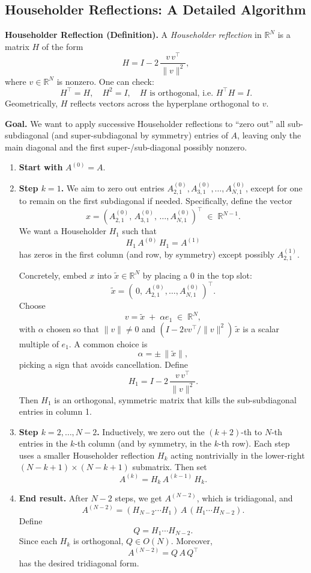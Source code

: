 \documentclass[letterpaper,11pt,oneside,reqno]{article}
\numberwithin{equation}{section}
\theoremstyle{definition}
\begin{document}
\subsection{Householder Reflections: A Detailed Algorithm}

\noindent
\textbf{Householder Reflection (Definition).}
A \emph{Householder reflection} in \(\mathbb{R}^N\) is a matrix \(H\) of the form
\[
  H = I - 2\,\frac{v\,v^\top}{\|v\|^2},
\]
where \(v\in\mathbb{R}^N\) is nonzero. One can check:
\[
  H^\top = H,\quad
  H^2 = I,\quad
  H\text{ is orthogonal, i.e.\ }H^\top H = I.
\]
Geometrically, \(H\) reflects vectors across the hyperplane orthogonal to \(v\).

\medskip
\noindent
\textbf{Goal.}
We want to apply successive Householder reflections to “zero out” all sub-subdiagonal (and super-subdiagonal by symmetry) entries of \(A\), leaving only the main diagonal and the first super-/sub-diagonal possibly nonzero.

\begin{enumerate}[1.]
\item \textbf{Start with } \(A^{(0)}=A\).
\item \textbf{Step \(k=1\).}
   We aim to zero out entries \(A^{(0)}_{2,1},A^{(0)}_{3,1},\ldots,A^{(0)}_{N,1}\), except for one to remain on the first subdiagonal if needed. Specifically, define the vector
   \[
     x
     = (A^{(0)}_{2,1},\,A^{(0)}_{3,1},\,\dots,A^{(0)}_{N,1})^\top
     \;\in\;\mathbb{R}^{N-1}.
   \]
   We want a Householder \(H_1\) such that
   \[
     H_1\,A^{(0)}\,H_1
     = A^{(1)}
   \]
   has zeros in the first column (and row, by symmetry) except possibly \(A^{(1)}_{2,1}\).

   Concretely, embed \(x\) into \(\tilde x \in \mathbb{R}^N\) by placing a \(0\) in the top slot:
   \[
     \tilde x = (\,0,\, A^{(0)}_{2,1},\ldots,A^{(0)}_{N,1}\,)^\top.
   \]
   Choose
   \[
     v = \tilde x \;+\;\alpha e_1
     \;\in\;\mathbb{R}^N,
   \]
   with \(\alpha\) chosen so that
   \(\|v\|\neq 0\) and \((I - 2vv^\top/\|v\|^2)\,\tilde x\) is a scalar multiple of \(e_1\).  A common choice is
   \[
     \alpha = \pm\,\|\tilde x\|,
   \]
   picking a sign that avoids cancellation.  Define
   \[
     H_1 = I - 2 \,\frac{v\,v^\top}{\|v\|^2}.
   \]
   Then \(H_1\) is an orthogonal, symmetric matrix that kills the sub-subdiagonal entries in column 1.
\item \textbf{Step \(k=2,\dots,N-2\).}
   Inductively, we zero out the \((k+2)\)-th to \(N\)-th entries in the \(k\)-th column (and by symmetry, in the \(k\)-th row).  Each step uses a smaller Householder reflection \(H_k\) acting nontrivially in the lower-right \((N-k+1)\times(N-k+1)\) submatrix.  Then set
   \[
     A^{(k)} = H_k\,A^{(k-1)}\,H_k.
   \]
\item \textbf{End result.}
   After \(N-2\) steps, we get \(A^{(N-2)}\), which is tridiagonal, and
   \[
     A^{(N-2)}
     = (H_{N-2}\cdots H_1)\,A\,(H_1\cdots H_{N-2}).
   \]
   Define
   \[
     Q = H_1 \cdots H_{N-2}.
   \]
   Since each \(H_k\) is orthogonal, \(Q\in O(N)\). Moreover,
   \[
     A^{(N-2)} = Q\,A\,Q^\top
   \]
   has the desired tridiagonal form.
\end{enumerate}
\end{document}
